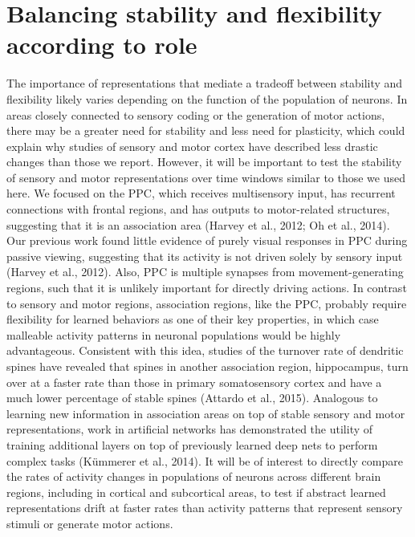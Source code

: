 \section{Balancing stability and flexibility according to role} \label{discussion:stab_vs_flex_by_role}

The importance of representations that mediate a tradeoff between stability and flexibility likely varies depending on the function of the population of neurons. In areas closely connected to sensory coding or the generation of motor actions, there may be a greater need for stability and less need for plasticity, which could explain why studies of sensory and motor cortex have described less drastic changes than those we report. However, it will be important to test the stability of sensory and motor representations over time windows similar to those we used here. We focused on the PPC, which receives multisensory input, has recurrent connections with frontal regions, and has outputs to motor-related structures, suggesting that it is an association area (Harvey et al., 2012; Oh et al., 2014). Our previous work found little evidence of purely visual responses in PPC during passive viewing, suggesting that its activity is not driven solely by sensory input (Harvey et al., 2012). Also, PPC is multiple synapses from movement-generating regions, such that it is unlikely important for directly driving actions. In contrast to sensory and motor regions, association regions, like the PPC, probably require flexibility for learned behaviors as one of their key properties, in which case malleable activity patterns in neuronal populations would be highly advantageous. Consistent with this idea, studies of the turnover rate of dendritic spines have revealed that spines in another association region, hippocampus, turn over at a faster rate than those in primary somatosensory cortex and have a much lower percentage of stable spines (Attardo et al., 2015). Analogous to learning new information in association areas on top of stable sensory and motor representations, work in artificial networks has demonstrated the utility of training additional layers on top of previously learned deep nets to perform complex tasks (Kümmerer et al., 2014). It will be of interest to directly compare the rates of activity changes in populations of neurons across different brain regions, including in cortical and subcortical areas, to test if abstract learned representations drift at faster rates than activity patterns that represent sensory stimuli or generate motor actions.

